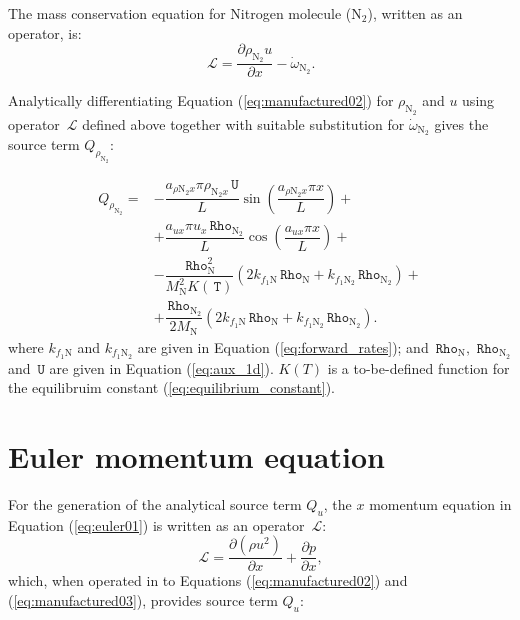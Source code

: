 \documentclass[10pt]{article}
\newcommand{\Diff}[2] {\dfrac{\partial( #1)}{\partial #2}}
\newcommand{\diff}[2] {\dfrac{\partial #1 }{\partial #2}}
\newcommand{\Lo}{\,\mathcal{L}}
\newcommand{\Rho}{\,\mathtt{Rho}}
\newcommand{\T}{\,\mathtt{T}}
\newcommand{\U}{\,\mathtt{U}}
\begin{document}
The mass conservation equation for Nitrogen molecule ($\text{N}_2$), written as an operator, is:
\begin{equation*}
 \label{eq:euler1d_11a}
\Lo =  \diff{\rho_{\text{N}_2} u }{x} - \dot{\omega}_{\text{N}_2}.
\end{equation*}

Analytically differentiating Equation (\ref{eq:manufactured02}) for $\rho_{\text{N}_2}$ and $u$ using operator $\Lo$ defined above together with suitable substitution for $\dot{\omega}_{\text{N}_2}$ gives the source term $Q_{\rho_{\text{N}_2}}$:

\begin{equation}
\begin{split}
Q_{\rho_{\text{N}_2}}=&-\dfrac{a_{ \rho \text{N}_2 x} \pi \rho_{\text{N}_2 x} \U }{L}\sin\left(\dfrac{a_{ \rho \text{N}_2 x} \pi x}{L}\right)+\\
&+\dfrac{a_{ux} \pi u_x \Rho_{\text{N}_2} }{L}\cos\left(\dfrac{a_{ux} \pi x}{L}\right)+\\
&-\dfrac{\Rho_\text{N}^2}{M_{\text{N}}^2 K(\T)} \left(2 k_{f_1 \text{N}} \Rho_\text{N}+k_{f_1 \text{N}_2} \Rho_{\text{N}_2}\right) +\\
&+\dfrac{\Rho_{\text{N}_2}}{2M_{\text{N}}}\left(2 k_{f_1 \text{N}} \Rho_\text{N}+k_{f_1 \text{N}_2} \Rho_{\text{N}_2}\right) .
\end{split}
\end{equation}
where  $k_{f_1 \text{N}}$ and $k_{f_1 \text{N}_2}$ are given in Equation (\ref{eq:forward_rates}); and $\Rho_{\text{N}},\,\Rho_{\text{N}_2}$ and $\U$ are given in Equation (\ref{eq:aux_1d}).  $K(T)$ is a to-be-defined function for the equilibruim constant (\ref{eq:equilibrium_constant}).


\section{Euler momentum equation}

For the generation of the analytical source term $Q_u$, the $x$ momentum equation in Equation (\ref{eq:euler01}) is written as an operator $\Lo$:
\begin{equation*}
 \label{eq:euler1d_12}
\Lo =\Diff{\rho u^2}{x}+\diff{p}{x},
\end{equation*}
which, when operated in to Equations (\ref{eq:manufactured02}) and (\ref{eq:manufactured03}), provides source term $Q_{u}$:
\end{document}
